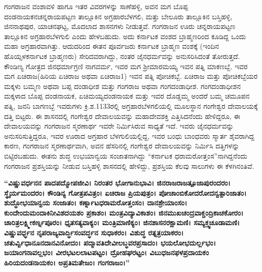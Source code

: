 ಗಂಗರಾಜನ ವಂಶಾವಳಿ ಹಾಗೂ ಇತರ ವಿವರಗಳನ್ನು ಸಾಣೆಹಳ್ಳಿ, ಅವನ ಮಗ ಬೊಪ್ಪ ದಂಡನಾಯಕನ\break ಚನ್ನರಾಯಪಟ್ಟಣ ತಾಲ್ಲೂಕಿನ ಅಗ್ರಹಾರಬೆಳಗಲಿ, ಮತ್ತು ಬೇಲೂರು ತಾಲ್ಲೂಕಿನ ಬಸ್ತಿಹಳ್ಳಿ, ಜಿನನಾಥಪುರ, ಯಾಚನಘಟ್ಟ, ಮೊದಲಾದ ಶಾಸನಗಳು ನೀಡುತ್ತವೆ. ಗಂಗರಾಜನ ಊರು ಚನ್ನರಾಯಪಟ್ಟಣ ತಾಲ್ಲೂಕಿನ ಅಗ್ರಹಾರ\-ಬೆಳಗುಲಿ ಎಂದು ಹೇಳಬಹುದು. ಅದು ಕರ್ನಾಟಕ ವಂಶದ ಬ್ರಾಹ್ಮಣರಿಂದ ಕೂಡಿದ್ದ ಒಂದು ಮಹಾ ಅಗ್ರಹಾರವಾಗಿತ್ತು. ಆದುದರಿಂದ ಈತನ ಪೂರ್ವಜರು ಕರ್ನಾಟಕ ಬ್ರಾಹ್ಮಣ ವಂಶಕ್ಕೆ (ಇಂದಿನ ಹೊಯ್ಸಳಕರ್ನಾಟಕ ಬ್ರಾಹ್ಮಣರು) ಸೇರಿದವರಾಗಿದ್ದು, ನಂತರ ಜೈನಧರ್ಮವನ್ನು ಅನುಸರಿಸಿದಂತೆ ತೋರುತ್ತದೆ. ಕೌಂಡಿಣ್ಯ ಗೋತ್ರದ ಜಿನಧರ್ಮಾಗ್ರಣಿ ನಾಗವರ್ಮ, ಇವರ ಮಗ ಶ‍್ರೀಮಾರಮಯ್ಯ ಇವನ ಪತ್ನಿ ಮಾಕಣಬ್ಬೆ. ಇವರ ಮಗ ಏಚಿರಾಜ(ಹಿರಿಯ ಏಚಿರಾಜ ಅಥವಾ ಏಚಿರಾಜ\enginline{-}1) ಇವನ ಪತ್ನಿ ಪೋಚಿಕಬ್ಬೆ. ಏಚಿರಾಜ ಮತ್ತು ಪೋಚಿಕಬ್ಬೆಯರ ಮಕ್ಕಳು ಬಮ್ಮಣ ಅಥವಾ ಬಪ್ಪ ದಂಡಾಧೀಶ ಮತ್ತು ಗಂಗರಾಜ ಅಥವಾ ಗಂಗದಂಡಾಧೀಶ. ಗಂಗದಂಡಾಧೀಶನ ಮಕ್ಕಳಾದ ಬೊಪ್ಪ ದಂಡನಾಯಕ, ಏಚಿಮಯ್ಯದಂಡನಾಯಕ ಮತ್ತು ಇವರ ದೊಡ್ಡಮ್ಮ ಅಂದರೆ ಬಮ್ಮ ಚಮೂಪನ ಪತ್ನಿ, ಜನನಿ ಬಾಗಣಬ್ಬೆ ಇವರುಗಳು ಕ್ರಿ.ಶ.1133ರಲ್ಲಿ ಅಗ್ರಹಾರಬೆಳಗಲಿಯಲ್ಲಿ ಮೂಲಸ್ಥಾನ ಗಂಗೇಶ್ವರ ದೇವಾಲಯಕ್ಕೆ ದತ್ತಿ ಬಿಟ್ಟರು. ಈ ಶಾಸನದಲ್ಲಿ ಗಂಗೇಶ್ವರ ದೇವಾಲಯವನ್ನು ಮಹಾದೇವಶಕ್ತಿ ಎತ್ತಿಸಿದನೆಂದು ಹೇಳಿದ್ದರೂ, ಈ ದೇವಾಲಯವನ್ನು ಗಂಗರಾಜನ ಸ್ಮರಣಾರ್ಥ ಇವರೇ ನಿರ್ಮಿಸಿರುವ ಸಾಧ್ಯತೆ ಇದೆ. ಇವರು ಜೈನಧರ್ಮವನ್ನು ಅನುಸರಿಸುತ್ತಿದ್ದರೂ, ಇವರ ಊರಾದ ಅಗ್ರಹಾರ ಬೆಳಗುಲಿಯಲ್ಲಿದ್ದ, ಇವರ ಬಂಧು ಬಾಂಧವರು ಸ್ಮಾರ್ತ ಶೈವರಾಗಿದ್ದ ಕಾರಣ, ಗಂಗರಾಜನ ಸ್ಮರಣಾರ್ಥವಾಗಿ, ಅವನ ಹೆಸರಿನಲ್ಲಿ ಗಂಗೇಶ್ವರ ದೇವಾಲಯವನ್ನು ನಿರ್ಮಿಸಿ ದತ್ತಿಗಳನ್ನು ಬಿಟ್ಟಿರಬಹುದು. ಈತನು ಶುದ್ಧ ಉಭಯಾನ್ವಯ ಸಂಜಾತನಾಗಿದ್ದು “ಕರ್ನಾಟಕ ಧರಾಮರೋತ್ತಂಸ”ನಾಗಿದ್ದನೆಂದು ಗಂಗರಾಜನ ಪ್ರಶಸ್ತಿಯನ್ನು ನೀಡುವ ಬಸ್ತಿಹಳ್ಳಿ ಶಾಸನದಲ್ಲಿ ಹೇಳಿದ್ದು, ಪ್ರಶಸ್ತಿಯ ಕೆಲವು ಸಾಲುಗಳು ಈ ಕೆಳಗಿನಂತಿವೆ.

\textbf{“ವಿಷ್ಣುವರ್ಧನನ ಪಾದಪದ್ಮೋಪಜೀವಿ। ನಿರಂತರ ಭೋಗಾನುಭಾವಿ। ಜಿನರಾಜರಾಜತ್ಪೂಜಾಪುರಂದರಂ।\general{\break } ಸ್ಥೈರ್ಯಮಂದರಂ। ಕೌಂಡಿನ್ಯ ಗೋತ್ರಪವಿತ್ರಂ। ಏಚಿರಾಜ ಪ್ರಿಯಪುತ್ರಂ। ಪೋಚಾಂಬಿಕೋದರೋದನ್ವತ್ಪಾರಿಜಾತಂ।\general{\break } ಶುದ್ಧೋಭಯಾನ್ವಯ ಸಂಜಾತಂ। ಕರ್ಣ್ನಾಟಧರಾಮರೋತ್ತಂಸಂ। ದಾನಶ್ರೇಯಾಂಸಂ। ಕುಂದೇಂದುಮಂದಾಕಿನೀವಿಶದಯಶಂ ಪ್ರಕಾಶಂ। ಮಂತ್ರವಿದ್ಯಾವಿಕಾಶಂ। ಜಿನಮುಖಚಂದ್ರವಾಕ್ಚಂದ್ರಿಕಾಚಕೋರಂ। ಚಾರಿತ್ರಲಕ್ಷ್ಮೀಕರ್ಣ್ನಪೂರಂ। ಧೃತಸತ್ಯವಾಕ್ಯಂ। ಮಂತ್ರಿಮಾಣಿಕ್ಯಂ। ಜಿನಶಾಸನರಕ್ಷಾಮಣಿ। ಸಮ್ಯಕ್ತ್ವಚೂಡಾಮಣಿ। ವಿಷ್ಣುವರ್ಧ್ಧನ ನೃಪರಾಜ್ಯವಾರ್ದ್ಧಿಸಂವರ್ದ್ಧನ ಸುಧಾಕರಂ। ವಿಶುದ್ಧ ರತ್ನತ್ರಯಾಕರಂ। ಚತುರ್ವ್ವಿಧಾನೂನದಾನವಿನೋದಂ। ಪದ್ಮಾವತಿದೇವೀಲಬ್ಧವರಪ್ರಸಾದಂ। ಭಯಲೋಭದುರ್ಲ್ಲಭಂ। ಜಯಾಂಗನಾವಲ್ಲಭಂ। ವೀರಭಟಲಲಾಟಪಟ್ಟಂ। ದ್ರೋಹಘರಟ್ಟಂ। ವಿಬುಧಜನಫಳಪ್ರದಾಯಕಂ ಹಿರಿಯದಂಡನಾಯಕಂ। ಅಪ್ರತಿಮತೇಜಂ। ಗಂಗರಾಜಂ।”}

